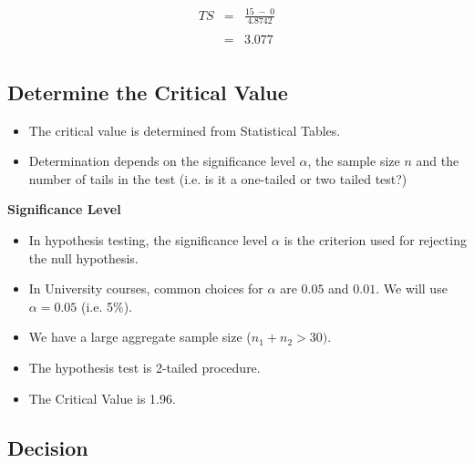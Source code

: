 \documentclass[a4paper,12pt]{article}
\begin{document}
\begin{eqnarray*}
TS &=& \frac{ 15\;-\; 0}{4.8742 } \\
& & \\
&=& 3.077\\
\end{eqnarray*}
\newpage 
\subsection*{Determine the Critical Value}

\begin{itemize}
\item The critical value is determined from Statistical Tables.
\item Determination depends on the significance level $\alpha$, the sample size $n$ and the number of tails in the test (i.e. is it a one-tailed or two tailed test?)
\end{itemize}

\noindent \textbf{Significance Level}

\begin{itemize}
\item In hypothesis testing, the significance level $\alpha$ is the criterion used for rejecting the null hypothesis. 

\item In University courses, common choices for $\alpha$ are $0.05$ and $0.01$. We will use $\alpha =0.05$ (i.e. 5\%).
\item We have a large aggregate sample size ($n_1 + n_2 > 30)$.
\item The hypothesis test is 2-tailed procedure.
\item The Critical Value is 1.96.
\end{itemize}


\newpage 
\subsection*{Decision}
\end{document}

